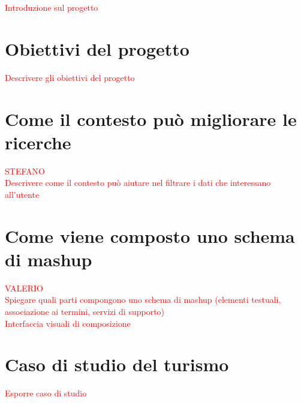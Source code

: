 \textcolor{red}{Introduzione sul progetto}

\section{Obiettivi del progetto\label{sec:obiettivi-progetto}}

\textcolor{red}{Descrivere gli obiettivi del progetto}

\section{Come il contesto pu\`o migliorare le ricerche\label{sec:contesto-ricerche}}

\textcolor{red}{STEFANO\\Descrivere come il contesto pu\`o aiutare nel filtrare i dati che interessano all'utente}

\section{Come viene composto uno schema di mashup\label{sec:schema-mashup}}

\textcolor{red}{VALERIO\\Spiegare quali parti compongono uno schema di mashup (elementi testuali, associazione ai termini, servizi di supporto)\\
Interfaccia visuali di composizione}

\section{Caso di studio del turismo\label{sec:caso-studio-turismo}}

\textcolor{red}{Esporre caso di studio}